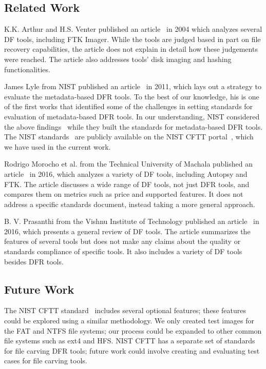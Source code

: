 \subsection{Related Work} \label{sec:discussion:subsec:related}

K.K. Arthur and H.S. Venter published an article~\cite{arthur2004} in 2004 which analyzes several DF tools, including FTK Imager.
While the tools are judged based in part on file recovery capabilities, the article does not explain in detail how these judgements were reached.
The article also addresses tools' disk imaging and hashing functionalities.

James Lyle from NIST published an article~\cite{lyle2011-ICDF2C} in 2011, which lays out a strategy to evaluate the metadata-based DFR tools. To the best of our knowledge, 
his is one of the first works that identified some of the challenges in setting standards for evaluation of metadata-based DFR tools.
In our understanding, NIST considered the above findings~\cite{lyle2011-ICDF2C} while they built the standards for metadata-based DFR tools.  
The NIST standards~\cite{meta:dfr:standards} are publicly available on the NIST CFTT portal~\cite{cftt:nist}, which we have used in the current work.

Rodrigo Morocho et al. from the Technical University of Machala published an article~\cite{morocho2016} in 2016, which analyzes a variety of DF tools, including Autopsy and FTK. 
The article discusses a wide range of DF tools, not just DFR tools, and compares them on metrics such as price and supported features. 
It does not address a specific standards document, instead taking a more general approach.

B. V. Prasanthi from the Vishnu Institute of Technology published an article~\cite{prasanthi2016} in 2016, which presents a general review of DF tools. 
The article summarizes the features of several tools but does not make any claims about the quality or standards compliance of specific tools.
It also includes a variety of DF tools besides DFR tools.


\subsection{Future Work}
The NIST CFTT standard~\cite{meta:dfr:standards} includes several optional features; these features could be explored using a similar methodology.
We only created test images for the FAT and NTFS file systems; our process could be expanded to other common file systems such as ext4 and HFS.
NIST CFTT has a separate set of standards for file carving DFR tools; future work could involve creating and evaluating test cases for file carving tools.
